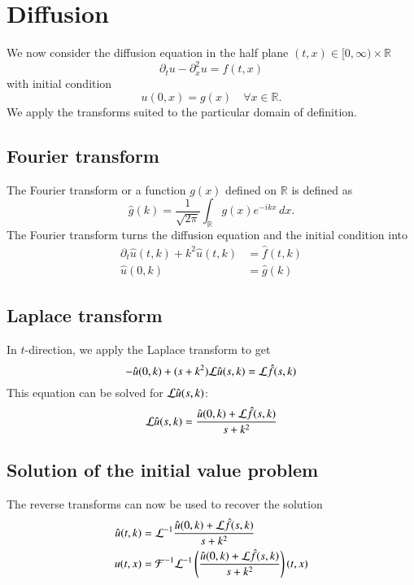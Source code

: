 %
%
%
\section{Diffusion}
We now consider the diffusion equation in the half plane
$(t,x)\in[0,\infty)\times \mathbb R$
\[
\partial_tu-\partial_x^2u=f(t,x)
\]
with initial condition
\[
u(0,x)=g(x)\quad \forall x\in\mathbb R.
\]
We apply the transforms suited to the particular domain of definition.

\subsection{Fourier transform}
The Fourier transform or a function $g(x)$ defined on $\mathbb R$ is
defined as
\[
\hat g(k)=\frac1{\sqrt{2\pi}}\int_{\mathbb R}g(x)e^{-ikx}\,dx.
\]
The Fourier transform turns the diffusion equation and the initial
condition into
\begin{align*}
\partial_t \hat u(t,k)+k^2\hat u(t,k)&=\hat f(t,k)\\
\hat u(0,k)&=\hat g(k)
\end{align*}

\subsection{Laplace transform}
In $t$-direction, we apply the Laplace transform to get
\[
-\hat u(0,k)+(s+k^2){\cal L}\hat u(s,k)={\cal L}\hat f(s,k)
\]
This equation can be solved for ${\cal L}\hat u(s,k)$:
\[
{\cal L}\hat u(s,k)=\frac{\hat u(0,k)+{\cal L}\hat f(s,k)}{s+k^2}
\]

\subsection{Solution of the initial value problem}
The reverse transforms can now be used to recover the solution
\begin{align*}
\hat u(t,k)&={\cal L}^{-1}
\frac{\hat u(0,k)+{\cal L}\hat f(s,k)}{s+k^2}
\\
u(t,x)&={\cal F}^{-1}{\cal L}^{-1}
\left(\frac{\hat u(0,k)+{\cal L}\hat f(s,k)}{s+k^2}\right)(t,x)
\end{align*}

